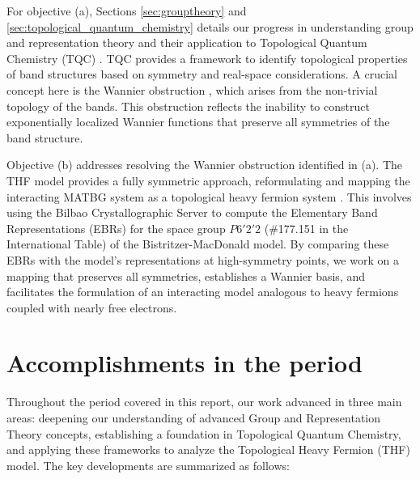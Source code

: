 \documentclass[12pt]{report}
\begin{document}
For objective (a), Sections \ref{sec:grouptheory} and \ref{sec:topological_quantum_chemistry} details our progress in understanding group and representation theory and their application to Topological Quantum Chemistry (TQC) \cite{topological_quantum_chemistry2017}. TQC provides a framework to identify topological properties of band structures based on symmetry and real-space considerations. A crucial concept here is the Wannier obstruction \cite{zou2018}, which arises from the non-trivial topology of the bands. This obstruction reflects the inability to construct exponentially localized Wannier functions that preserve all symmetries of the band structure.

Objective (b) addresses resolving the Wannier obstruction identified in (a). The THF model provides a fully symmetric approach, reformulating and mapping the interacting MATBG system as a topological heavy fermion system \cite{topoheavyfermion2022}. This involves using the Bilbao Crystallographic Server \cite{bilbao_1, bilbao_2} to compute the Elementary Band Representations (EBRs) for the space group \( P6'2'2 \) (\#177.151 in the International Table) of the Bistritzer-MacDonald model. By comparing these EBRs with the model's representations at high-symmetry points, we work on a mapping that preserves all symmetries, establishes a Wannier basis, and facilitates the formulation of an interacting model analogous to heavy fermions coupled with nearly free electrons.

\pagebreak


\chapter{Accomplishments in the period} \label{chp:accomplishments}

Throughout the period covered in this report, our work advanced in three main areas: deepening our understanding of advanced Group and Representation Theory concepts, establishing a foundation in Topological Quantum Chemistry, and applying these frameworks to analyze the Topological Heavy Fermion (THF) model. The key developments are summarized as follows:
\end{document}
